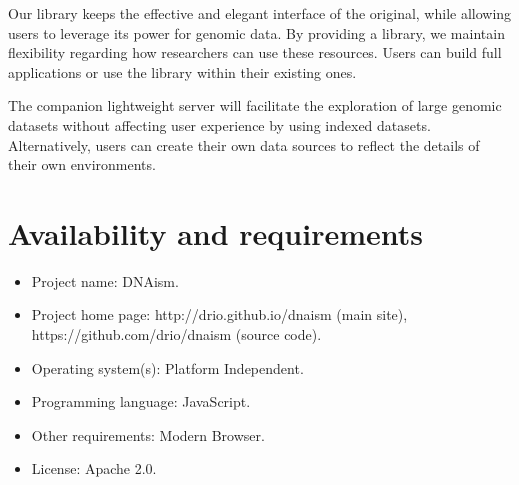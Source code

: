 \documentclass[twocolumn]{bmcart}
\begin{document}
Our library keeps the effective and elegant interface of the original, while
allowing users to leverage its power for genomic data. By providing a library,
we maintain flexibility regarding how researchers can use these resources.
Users can build full applications or use the library within their existing
ones.

The companion lightweight server will facilitate the exploration of large
genomic datasets without affecting user experience by using indexed datasets.
Alternatively, users can create their own data sources to reflect the details
of their own environments.





\section*{Availability and requirements}
\enspace
\begin{itemize}
  \item Project name: DNAism.
  \item Project home page: http://drio.github.io/dnaism (main site), https://github.com/drio/dnaism (source code).
  \item Operating system(s): Platform Independent.
  \item Programming language: JavaScript.
  \item Other requirements: Modern Browser.
  \item License: Apache 2.0.
\end{itemize}




\end{document}
